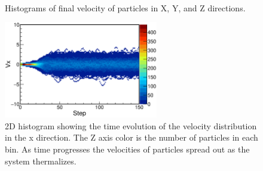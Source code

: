 \documentclass[singlepage,notitlepage,nofootinbib,11pt]{revtex4-1}
\begin{document}
\begin{figure}[h]
  \captionsetup[subfigure]{labelformat=empty}
  \centering
  \\
 \hfill
  \caption{\label{fig8} Histograms of final velocity of particles in X, Y, and Z directions.}
\end{figure}
\begin{figure}[h]
  \centering
\includegraphics[width=0.6\textwidth]{figures/vx_step.eps}
\hfill
\caption{\label{fig9} 2D histogram showing the time evolution of the velocity distribution in the x direction. The Z axis color is the number of particles in each bin. As time progresses the velocities of particles spread out as the system thermalizes.}
\end{figure}
\end{document}
